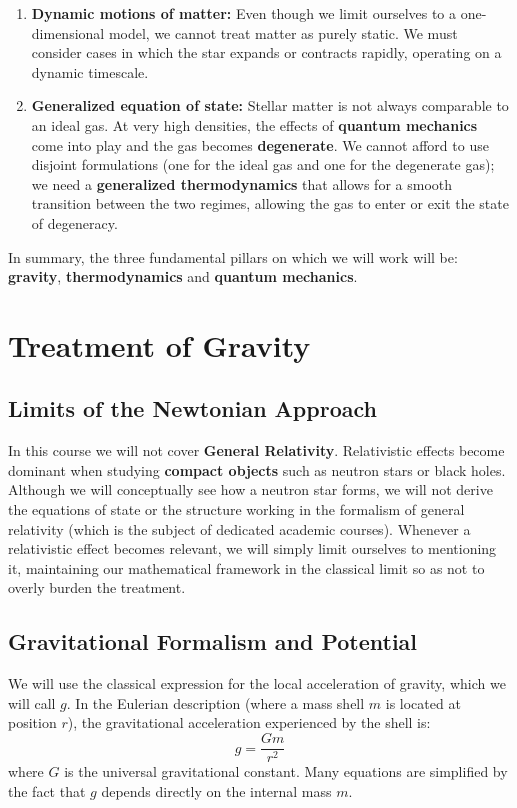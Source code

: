 \begin{enumerate}
\item \textbf{Dynamic motions of matter:} Even though we limit ourselves to a one-dimensional model, we cannot treat matter as purely static. We must consider cases in which the star expands or contracts rapidly, operating on a dynamic timescale.
\item \textbf{Generalized equation of state:} Stellar matter is not always comparable to an ideal gas. At very high densities, the effects of \textbf{quantum mechanics} come into play and the gas becomes \textbf{degenerate}. We cannot afford to use disjoint formulations (one for the ideal gas and one for the degenerate gas); we need a \textbf{generalized thermodynamics} that allows for a smooth transition between the two regimes, allowing the gas to enter or exit the state of degeneracy.
\end{enumerate}
In summary, the three fundamental pillars on which we will work will be: \textbf{gravity}, \textbf{thermodynamics} and \textbf{quantum mechanics}.

\section{Treatment of Gravity}

\subsection{Limits of the Newtonian Approach}
In this course we will not cover \textbf{General Relativity}. Relativistic effects become dominant when studying \textbf{compact objects} such as neutron stars or black holes. Although we will conceptually see how a neutron star forms, we will not derive the equations of state or the structure working in the formalism of general relativity (which is the subject of dedicated academic courses). Whenever a relativistic effect becomes relevant, we will simply limit ourselves to mentioning it, maintaining our mathematical framework in the classical limit so as not to overly burden the treatment.

\subsection{Gravitational Formalism and Potential}
We will use the classical expression for the local acceleration of gravity, which we will call $g$. In the Eulerian description (where a mass shell $m$ is located at position $r$), the gravitational acceleration experienced by the shell is:
\begin{equation}
g = \frac{G m}{r^2}
\end{equation}
where $G$ is the universal gravitational constant. Many equations are simplified by the fact that $g$ depends directly on the internal mass $m$.

